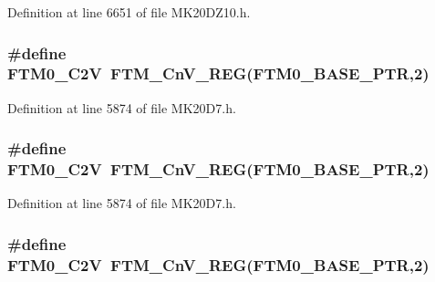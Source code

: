 Definition at line 6651 of file M\+K20\+D\+Z10.\+h.

\subsubsection[{\texorpdfstring{F\+T\+M0\+\_\+\+C2V}{FTM0_C2V}}]{\setlength{\rightskip}{0pt plus 5cm}\#define F\+T\+M0\+\_\+\+C2V~{\bf F\+T\+M\+\_\+\+Cn\+V\+\_\+\+R\+EG}({\bf F\+T\+M0\+\_\+\+B\+A\+S\+E\+\_\+\+P\+TR},2)}\hypertarget{group___f_t_m___register___accessor___macros_ga88982c608dd8c04663a5debe4857cc75}{}\label{group___f_t_m___register___accessor___macros_ga88982c608dd8c04663a5debe4857cc75}


Definition at line 5874 of file M\+K20\+D7.\+h.

\subsubsection[{\texorpdfstring{F\+T\+M0\+\_\+\+C2V}{FTM0_C2V}}]{\setlength{\rightskip}{0pt plus 5cm}\#define F\+T\+M0\+\_\+\+C2V~{\bf F\+T\+M\+\_\+\+Cn\+V\+\_\+\+R\+EG}({\bf F\+T\+M0\+\_\+\+B\+A\+S\+E\+\_\+\+P\+TR},2)}\hypertarget{group___f_t_m___register___accessor___macros_ga88982c608dd8c04663a5debe4857cc75}{}\label{group___f_t_m___register___accessor___macros_ga88982c608dd8c04663a5debe4857cc75}


Definition at line 5874 of file M\+K20\+D7.\+h.

\subsubsection[{\texorpdfstring{F\+T\+M0\+\_\+\+C2V}{FTM0_C2V}}]{\setlength{\rightskip}{0pt plus 5cm}\#define F\+T\+M0\+\_\+\+C2V~{\bf F\+T\+M\+\_\+\+Cn\+V\+\_\+\+R\+EG}({\bf F\+T\+M0\+\_\+\+B\+A\+S\+E\+\_\+\+P\+TR},2)}\hypertarget{group___f_t_m___register___accessor___macros_ga88982c608dd8c04663a5debe4857cc75}{}\label{group___f_t_m___register___accessor___macros_ga88982c608dd8c04663a5debe4857cc75}


